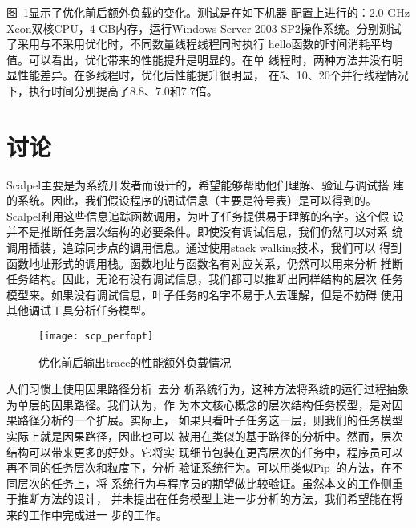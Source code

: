 图~\ref{fig:scpperf_opt}显示了优化前后额外负载的变化。测试是在如下机器
配置上进行的：2.0 GHz Xeon双核CPU，4 GB内存，运行Windows Server 2003
SP2操作系统。分别测试了采用与不采用优化时，不同数量线程线程同时执行
hello函数的时间消耗平均值。可以看出，优化带来的性能提升是明显的。在单
线程时，两种方法并没有明显性能差异。在多线程时，优化后性能提升很明显，
在5、10、20个并行线程情况下，执行时间分别提高了8.8、7.0和7.7倍。

\section{讨论}
\label{sec:scp:discussion}

Scalpel主要是为系统开发者而设计的，希望能够帮助他们理解、验证与调试搭
建的系统。因此，我们假设程序的调试信息（主要是符号表）是可以得到的。
Scalpel利用这些信息追踪函数调用，为叶子任务提供易于理解的名字。这个假
设并不是推断任务层次结构的必要条件。即使没有调试信息，我们仍然可以对系
统调用插装，追踪同步点的调用信息。通过使用stack walking技术，我们可以
得到函数地址形式的调用栈。函数地址与函数名有对应关系，仍然可以用来分析
推断任务结构。因此，无论有没有调试信息，我们都可以推断出同样结构的层次
任务模型来。如果没有调试信息，叶子任务的名字不易于人去理解，但是不妨碍
使用其他调试工具分析任务模型。

\begin{figure}
  \centering
  \begin{minipage}{0.8\linewidth}
    \centering
    \texttt{[image: scp\_perfopt]}
    \caption{优化前后输出trace的性能额外负载情况}
    \label{fig:scpperf_opt}
  \end{minipage}
\end{figure}

人们习惯上使用因果路径分析~\cite{pinpoint, project5, pip, magpie}去分
析系统行为，这种方法将系统的运行过程抽象为单层的因果路径。我们认为，作
为本文核心概念的层次结构任务模型，是对因果路径分析的一个扩展。实际上，
如果只看叶子任务这一层，则我们的任务模型实际上就是因果路径，因此也可以
被用在类似的基于路径的分析中。然而，层次结构可以带来更多的好处。它将实
现细节包装在更高层次的任务中，程序员可以再不同的任务层次和粒度下，分析
验证系统行为。可以用类似Pip~\cite{pip}的方法，在不同层次的任务上，将
系统行为与程序员的期望做比较验证。虽然本文的工作侧重于推断方法的设计，
并未提出在任务模型上进一步分析的方法，我们希望能在将来的工作中完成进一
步的工作。


